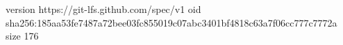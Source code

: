 version https://git-lfs.github.com/spec/v1
oid sha256:185aa53fe7487a72bee03fc855019c07abc3401bf4818c63a7f06cc777c7772a
size 176

